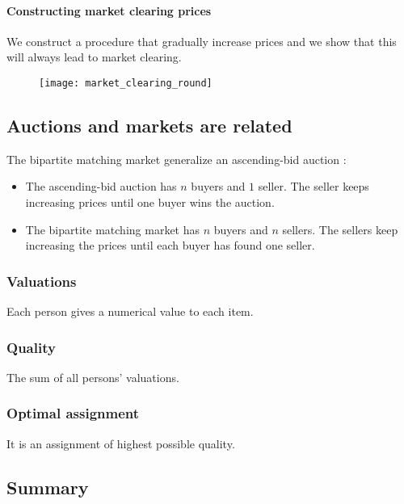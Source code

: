 \paragraph{Constructing market clearing prices}

We construct a procedure that gradually increase prices and we show that this will always lead to market clearing.

\begin{figure}[H]
    \centering
    \texttt{[image: market\_clearing\_round]}
\end{figure}

\subsection{Auctions and markets are related}

The bipartite matching market generalize an ascending-bid auction :
\begin{itemize}
\item The ascending-bid auction has $n$ buyers and $1$ seller. The seller keeps increasing prices until one buyer wins the auction.
\item The bipartite matching market has $n$ buyers and $n$ sellers. The sellers keep increasing the prices until each buyer has found one seller.
\end{itemize}

\subsubsection{Valuations}

Each person gives a numerical value to each item.

\subsubsection{Quality}

The sum of all persons' valuations.

\subsubsection{Optimal assignment}

It is an assignment of highest possible quality.

\subsection{Summary}

